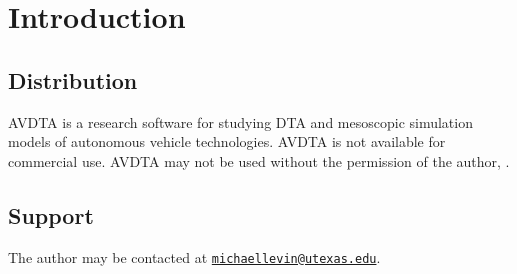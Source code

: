\chapter{Introduction}





\section{Distribution}
AVDTA is a research software for studying DTA and mesoscopic simulation models of autonomous vehicle technologies. AVDTA is not available for commercial use. AVDTA may not be used without the permission of the author, \theauthor.


\section{Support}
The author may be contacted at \href{mailto:michaellevin@utexas.edu}{\texttt{michaellevin@utexas.edu}}.